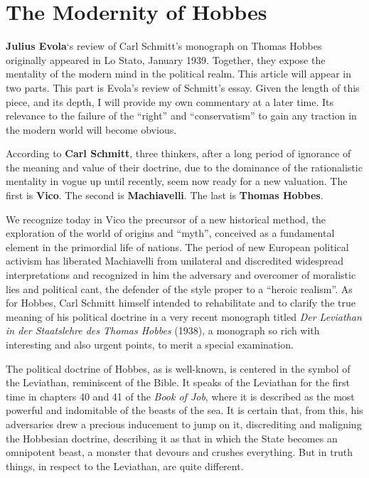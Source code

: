 \section{The Modernity of Hobbes}

\begin{quotex}
\textbf{Julius Evola}`s review of Carl Schmitt's monograph on Thomas Hobbes originally appeared in Lo Stato, January 1939. Together, they expose the mentality of the modern mind in the political realm. This article will appear in two parts. This part is Evola's review of Schmitt's essay. Given the length of this piece, and its depth, I will provide my own commentary at a later time. Its relevance to the failure of the ``right'' and ``conservatism'' to gain any traction in the modern world will become obvious.
\end{quotex}


According to \textbf{Carl Schmitt}, three thinkers, after a long period of ignorance of the meaning and value of their doctrine, due to the dominance of the rationalistic mentality in vogue up until recently, seem now ready for a new valuation. The first is \textbf{Vico}. The second is \textbf{Machiavelli}. The last is \textbf{Thomas Hobbes}.

We recognize today in Vico the precursor of a new historical method, the exploration of the world of origins and ``myth'', conceived as a fundamental element in the primordial life of nations. The period of new European political activism has liberated Machiavelli from unilateral and discredited widespread interpretations and recognized in him the adversary and overcomer of moralistic lies and political cant, the defender of the style proper to a ``heroic realism''. As for Hobbes, Carl Schmitt himself intended to rehabilitate and to clarify the true meaning of his political doctrine in a very recent monograph titled \emph{Der Leviathan in der Staatslehre des Thomas Hobbes} (1938), a monograph so rich with interesting and also urgent points, to merit a special examination.

The political doctrine of Hobbes, as is well-known, is centered in the symbol of the Leviathan, reminiscent of the Bible. It speaks of the Leviathan for the first time in chapters 40 and 41 of the \emph{Book of Job}, where it is described as the most powerful and indomitable of the beasts of the sea. It is certain that, from this, his adversaries drew a precious inducement to jump on it, discrediting and maligning the Hobbesian doctrine, describing it as that in which the State becomes an omnipotent beast, a monster that devours and crushes everything. But in truth things, in respect to the Leviathan, are quite different.

